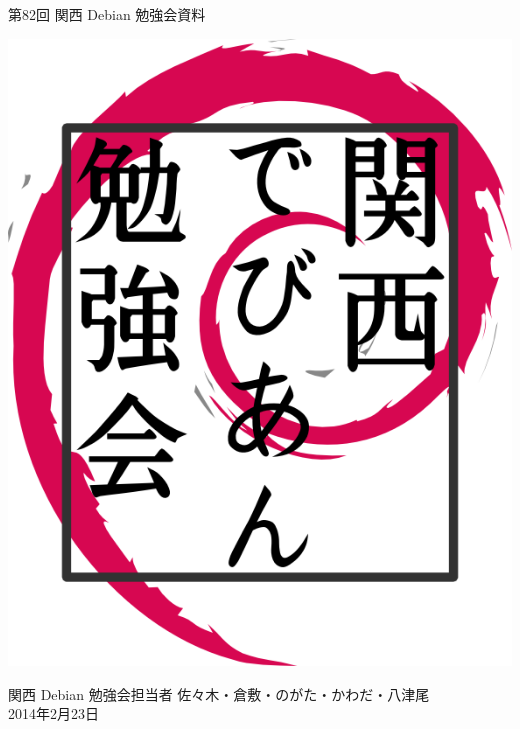 \documentclass[mingoth,a4paper]{jsarticle}
\newcommand{\debmtgyear}{2014}
\newcommand{\debmtgdate}{23}
\newcommand{\debmtgmonth}{2}
\newcommand{\debmtgnumber}{82}
\begin{document}
\begin{titlepage}


 第\debmtgnumber{}回 関西 Debian 勉強会資料

\vspace{2cm}

\begin{center}
\includegraphics{image200802/kansaidebianlogo.png}
\end{center}

\begin{flushright}
\hfill{}関西 Debian 勉強会担当者 佐々木・倉敷・のがた・かわだ・八津尾 \\
\hfill{}\debmtgyear{}年\debmtgmonth{}月\debmtgdate{}日
\end{flushright}

\thispagestyle{empty}
\end{titlepage}


\vspace{1em}
\end{document}
